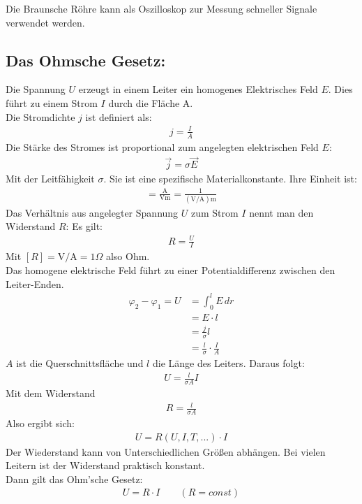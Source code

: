 \documentclass{article}
\begin{document}
\vspace{0.5cm}
\noindent Die Braunsche Röhre kann als Oszilloskop zur Messung schneller Signale verwendet werden.

\subsection{Das Ohmsche Gesetz:}
Die Spannung $U$ erzeugt in einem Leiter ein homogenes Elektrisches Feld $E$.
Dies führt zu einem Strom $I$ durch die Fläche A.\\
Die Stromdichte $j$ ist definiert als:
\begin{align}
    j=\frac{I}{A}
\end{align}
Die Stärke des Stromes ist proportional zum angelegten elektrischen Feld $E$:
\begin{align}
    \vec{j}=\sigma \vec{E}
\end{align}
Mit der Leitfähigkeit $\sigma$. Sie ist eine spezifische Materialkonstante. Ihre Einheit ist:
\begin{align}
    [\sigma]=\frac{\mathrm{A}}{\mathrm{Vm}}=\frac{1}{\mathrm{(V/A)m}}
\end{align}
Das Verhältnis aus angelegter Spannung $U$ zum Strom $I$ nennt man den Widerstand $R$:
Es gilt:
\begin{align}
    R=\frac{U}{I}
\end{align}
Mit $[R]=\mathrm{V/A}=1\Omega$ also Ohm.\\

\noindent Das homogene elektrische Feld führt zu einer Potentialdifferenz zwischen den Leiter-Enden.
\begin{align}
    \varphi_2-\varphi_1=U&=\int_{0}^{l}E\, dr\\
    &=E\cdot l\\
    &=\frac{j}{\sigma}l\\
    &=\frac{l}{\sigma}\cdot \frac{I}{A}
\end{align}
$A$ ist die Querschnittsfläche und $l$ die Länge des Leiters. Daraus folgt:
\begin{align}
    U=\frac{l}{\sigma A}I
\end{align}
Mit dem Widerstand
\begin{align}
    R=\frac{l}{\sigma A}
\end{align}
Also ergibt sich:
\begin{align}
    U=R(U,I,T,...)\cdot I
\end{align}
Der Wiederstand kann von Unterschiedlichen Größen abhängen.
Bei vielen Leitern ist der Widerstand praktisch konstant.\\
Dann gilt das Ohm'sche Gesetz:
\begin{align}
    \boxed{U=R\cdot I}\qquad (R=const)
\end{align}
\end{document}
